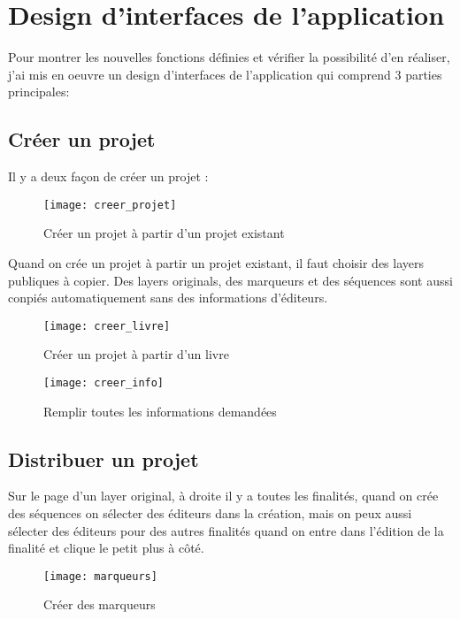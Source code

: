 \section{Design d'interfaces de l'application}

Pour montrer les nouvelles fonctions définies et vérifier la possibilité d'en réaliser, j'ai mis en oeuvre un design d'interfaces de l'application qui comprend 3 parties principales: 

\subsection{Créer un projet}

Il y a deux façon de créer un projet :

\begin{figure}[H]
\centering
\texttt{[image: creer\_projet]}
\caption{Créer un projet à partir d'un projet existant}
\end{figure}

Quand on crée un projet à partir un projet existant, il faut choisir des layers publiques à copier. Des layers originals, des marqueurs et des séquences sont aussi conpiés automatiquement sans des informations d'éditeurs. 

\begin{figure}[H]
\centering
\texttt{[image: creer\_livre]}
\caption{Créer un projet à partir d'un livre}
\end{figure}

\begin{figure}[H]
\centering
\texttt{[image: creer\_info]}
\caption{Remplir toutes les informations demandées}
\end{figure}

\subsection{Distribuer un projet}

Sur le page d'un layer original, à droite il y a toutes les finalités, quand on crée des séquences on sélecter des éditeurs dans la création, mais on peux aussi sélecter des éditeurs pour des autres finalités quand on entre dans l'édition de la finalité et clique le petit plus à côté.

\begin{figure}[H]
\centering
\texttt{[image: marqueurs]}
\caption{Créer des marqueurs}
\end{figure}

